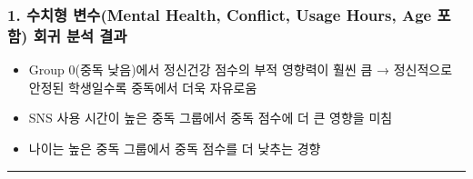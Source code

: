 \documentclass[11pt]{article}
\providecommand{\tightlist}{%
      \setlength{\itemsep}{0pt}\setlength{\parskip}{0pt}}
\begin{document}
    \subsubsection{1. 수치형 변수(Mental Health, Conflict, Usage Hours, Age
포함) 회귀 분석
결과}\label{uxc218uxce58uxd615-uxbcc0uxc218mental-health-conflict-usage-hours-age-uxd3ecuxd568-uxd68cuxadc0-uxbd84uxc11d-uxacb0uxacfc}

\begin{itemize}
\tightlist
\item
  Group 0(중독 낮음)에서 정신건강 점수의 부적 영향력이 훨씬 큼 →
  정신적으로 안정된 학생일수록 중독에서 더욱 자유로움
\item
  SNS 사용 시간이 높은 중독 그룹에서 중독 점수에 더 큰 영향을 미침
\item
  나이는 높은 중독 그룹에서 중독 점수를 더 낮추는 경향
\end{itemize}

\begin{center}\rule{0.5\linewidth}{0.5pt}\end{center}
\end{document}

